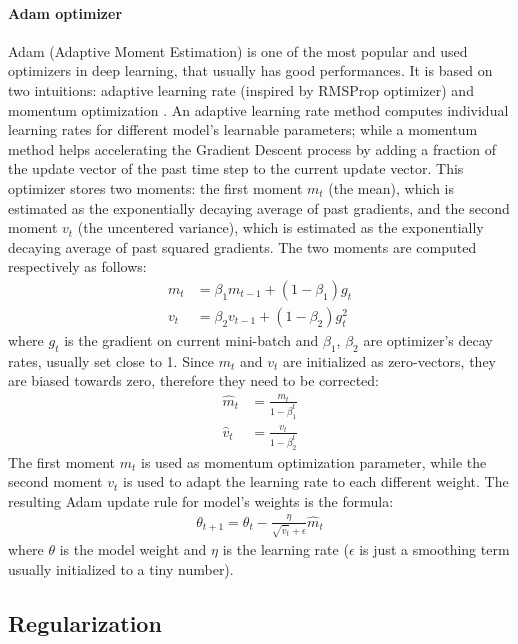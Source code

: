 \paragraph{Adam optimizer} Adam (Adaptive Moment Estimation) is one of the most popular and used optimizers in deep learning, that usually has good performances. It is based on two intuitions: adaptive learning rate (inspired by RMSProp optimizer) and momentum optimization \cite{arXiv:adam} \cite{arXiv:optimizers}. An adaptive learning rate method computes individual learning rates for different model's learnable parameters; while a momentum method helps accelerating the Gradient Descent process by adding a fraction of the update vector of the past time step to the current update vector. This optimizer stores two moments: the first moment $m_t$ (the mean), which is estimated as the exponentially decaying average of past gradients, and the second moment $v_t$ (the uncentered variance), which is estimated as the exponentially decaying average of past squared gradients. The two moments are computed respectively as follows:
\begin{align}
    m_{t} &=\beta_{1} m_{t-1}+\left(1-\beta_{1}\right) g_{t} \\
    v_{t} &=\beta_{2} v_{t-1}+\left(1-\beta_{2}\right) g_{t}^{2}
\end{align}
where $g_{t}$ is the gradient on current mini-batch and $\beta_1$, $\beta_2$ are optimizer's decay rates, usually set close to 1. Since $m_t$ and $v_t$ are initialized as zero-vectors, they are biased towards zero, therefore they need to be corrected:
\begin{align}
    \hat{m}_{t} &=\frac{m_{t}}{1-\beta_{1}^{t}} \\
    \hat{v}_{t} &=\frac{v_{t}}{1-\beta_{2}^{t}}
\end{align}
The first moment $m_t$ is used as momentum optimization parameter, while the second moment $v_t$ is used to adapt the learning rate to each different weight. The resulting Adam update rule for model's weights is the formula:
\begin{align}
    \theta_{t+1}=\theta_{t}-\frac{\eta}{\sqrt{\hat{v}_{t}}+\epsilon} \hat{m}_{t}
\end{align}
where $\theta$ is the model weight and $\eta$ is the learning rate ($\epsilon$ is just a smoothing term usually initialized to a tiny number).

\subsection{Regularization}
